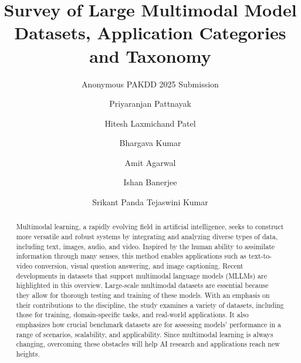\documentclass[runningheads]{llncs}
\begin{document}
%
\title{Survey of Large Multimodal Model Datasets, Application Categories and Taxonomy}
%
%
\author{Anonymous PAKDD 2025 Submission}
\author{Priyaranjan Pattnayak\and
Hitesh Laxmichand Patel \and
Bhargava Kumar \and
Amit Agarwal \and
Ishan Banerjee \and
Srikant Panda
Tejaswini Kumar}



\maketitle              %
%
\begin{abstract}
Multimodal learning, a rapidly evolving field in artificial intelligence, seeks to construct more versatile and robust systems by integrating and analyzing diverse types of data, including text, images, audio, and video. Inspired by the human ability to assimilate information through many senses, this method enables applications such as text-to-video conversion, visual question answering, and image captioning. Recent developments in datasets that support multimodal language models (MLLMs) are highlighted in this overview. Large-scale multimodal datasets are essential because they allow for thorough testing and training of these models. With an emphasis on their contributions to the discipline, the study examines a variety of datasets, including those for training, domain-specific tasks, and real-world applications. It also emphasizes how crucial benchmark datasets are for assessing models' performance in a range of scenarios, scalability, and applicability. Since multimodal learning is always changing, overcoming these obstacles will help AI research and applications reach new heights.

\end{abstract}
%
%
%
\end{document}
